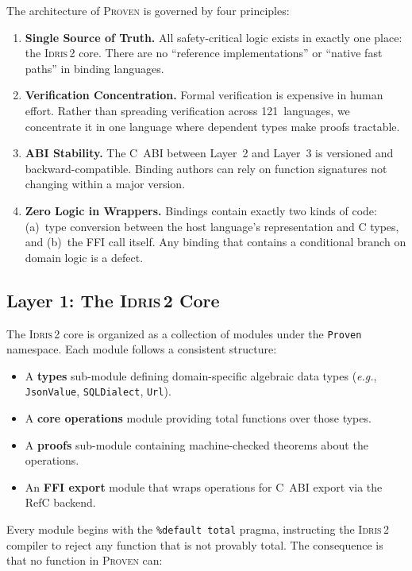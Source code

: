 \documentclass[11pt,a4paper]{article}
\newcommand{\proven}{\textsc{Proven}}
\newcommand{\idris}{\textsc{Idris\,2}}
\newcommand{\code}[1]{\texttt{#1}}
\newcommand{\eg}{\textit{e.g.}}
\begin{document}
The architecture of \proven{} is governed by four principles:

\begin{enumerate}[nosep]
  \item \textbf{Single Source of Truth.} All safety-critical logic exists
    in exactly one place: the \idris{} core. There are no ``reference
    implementations'' or ``native fast paths'' in binding languages.
  \item \textbf{Verification Concentration.} Formal verification is
    expensive in human effort. Rather than spreading verification across
    121~languages, we concentrate it in one language where dependent types
    make proofs tractable.
  \item \textbf{ABI Stability.} The C~ABI between Layer~2 and Layer~3 is
    versioned and backward-compatible. Binding authors can rely on function
    signatures not changing within a major version.
  \item \textbf{Zero Logic in Wrappers.} Bindings contain exactly two
    kinds of code: (a)~type conversion between the host language's
    representation and C types, and (b)~the FFI call itself. Any binding
    that contains a conditional branch on domain logic is a defect.
\end{enumerate}

\subsection{Layer 1: The \idris{} Core}
\label{sec:layer1}

The \idris{} core is organized as a collection of modules under the
\code{Proven} namespace. Each module follows a consistent structure:

\begin{itemize}[nosep]
  \item A \textbf{types} sub-module defining domain-specific algebraic
    data types (\eg, \code{JsonValue}, \code{SQLDialect},
    \code{Url}).
  \item A \textbf{core operations} module providing total functions over
    those types.
  \item A \textbf{proofs} sub-module containing machine-checked theorems
    about the operations.
  \item An \textbf{FFI export} module that wraps operations for C~ABI
    export via the RefC backend.
\end{itemize}

Every module begins with the \code{\%default total} pragma, instructing
the \idris{} compiler to reject any function that is not provably total.
The consequence is that no function in \proven{} can:
\end{document}
